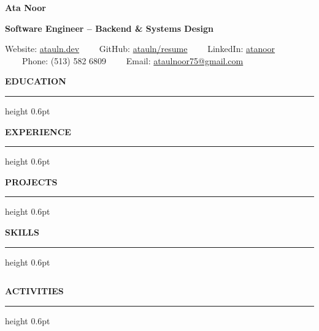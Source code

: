 \documentclass[10pt,letterpaper]{article}
\newcommand{\name}[1]{\def\cvname{#1}}
\newcommand{\tagline}[1]{\def\cvtagline{#1}}
\newcommand{\personalinfo}[1]{\def\cvpersonalinfo{#1}}
\newcommand{\github}[1]{GitHub: #1}
\newcommand{\linkedin}[1]{LinkedIn: #1}
\newcommand{\email}[1]{Email: #1}
\newcommand{\phone}[1]{Phone: #1}
\newcommand{\homepage}[1]{Website: #1}
\newcommand{\makecvheader}{
  \begin{center}
    {\Huge\bfseries\color{Teal}\cvname\par}
    \smallskip
    {\large\bfseries\color{Blue}\cvtagline\par}
    \medskip
    {\small\cvpersonalinfo\par}
  \end{center}
  \vspace{-1.2em}
}
\newcommand{\cvsection}[2][]{
  \vspace{0.35em}\par\noindent
  {\color{Teal}\large\bfseries\MakeUppercase{#2}\par}
  \vspace{0.4em}
  \hrule height 0.6pt
  \vspace{0.3em}\par
}
\newcommand{\cvsubsection}[1]{
  \vspace{0.25em}\par\noindent\textbf{#1:}\ 
}
\newcommand{\cvtag}[1]{\textcolor{Blue}{\mbox{\small #1}}\quad} %
\begin{document}
\pagestyle{empty}
\makeatletter

\name{Ata Noor}
\tagline{Software Engineer -- Backend \& Systems Design}
\personalinfo{
  \homepage{\href{https://atauln.dev}{atauln.dev}} \ \ \textbullet\ \ 
  \github{\href{https://github.com/atauln/resume}{atauln/resume}} \ \ \textbullet\ \ 
  \linkedin{\href{https://linkedin.com/in/atanoor}{atanoor}} \ \ \textbullet\ \ 
  \phone{(513) 582 6809} \ \ \textbullet\ \ 
  \email{\href{mailto:ataulnoor75@gmail.com}{ataulnoor75@gmail.com}}
}

\makecvheader

\cvsection{Education}


\cvsection{Experience}


\cvsection{Projects}


\cvsection{Skills}
\newif\iffirstrow
\firstrowtrue
\let\oldcvsubsection\cvsubsection
\renewcommand{\cvsubsection}[1]{%
  \iffirstrow
    \global\firstrowfalse
  \else
    \\ %
  \fi
  \textbf{#1:} & %
}
\let\oldmedskip\medskip
\renewcommand{\medskip}{} %
\begin{tabular}{@{}p{1.8in}p{5.4in}@{}}
  
\end{tabular}
\let\cvsubsection\oldcvsubsection
\let\medskip\oldmedskip

\cvsection{Activities}

\end{document}
